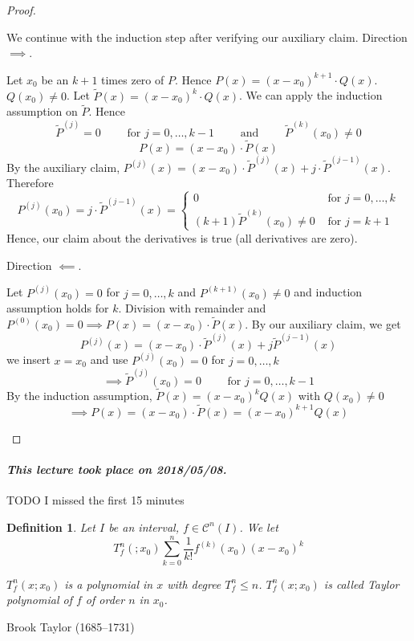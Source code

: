 \documentclass{article}
\newtheorem{definition}{Definition}  \numberwithin{definition}{section}
\newcommand{\dateref}[1]{\paragraph{\textit{This lecture took place on #1.}}}
\begin{document}
\begin{proof}
\begin{description}
      We continue with the induction step after verifying our auxiliary claim. Direction $\implies$.

      Let $x_0$ be an $k+1$ times zero of $P$. Hence $P(x) = (x - x_0)^{k+1} \cdot Q(x)$. $Q(x_0) \neq 0$.
      Let $\tilde P(x) = (x - x_0)^k \cdot Q(x)$. 
      We can apply the induction assumption on $\tilde P$. Hence
      \[ \tilde P^{(j)} = 0 \qquad \text{ for } j = 0, \ldots, k-1 \qquad \text{ and } \qquad \tilde P^{(k)}(x_0) \neq 0 \]
      \[ P(x) = (x - x_0) \cdot \tilde P(x) \]
      By the auxiliary claim, $P^{(j)}(x) = (x - x_0) \cdot \tilde P^{(j)}(x) + j \cdot \tilde P^{(j-1)}(x)$.
      Therefore
      \[
        P^{(j)}(x_0) = j \cdot \tilde P^{(j-1)}(x) = \begin{cases}
          0 & \text{ for } j = 0, \dots, k \\
          (k+1)\tilde P^{(k)}(x_0) \neq 0 & \text{ for } j = k+1
        \end{cases}
      \]
      Hence, our claim about the derivatives is true (all derivatives are zero).

      Direction $\impliedby$.

      Let $P^{(j)}(x_0) = 0$ for $j = 0, \dots, k$ and $P^{(k+1)}(x_0) \neq 0$ and induction assumption holds for $k$.
      Division with remainder and $P^{(0)}(x_0) = 0 \implies P(x) = (x - x_0) \cdot \tilde P(x)$.
      By our auxiliary claim, we get
      \[ P^{(j)}(x) = (x - x_0) \cdot \tilde P^{(j)}(x) + j \tilde P^{(j-1)}(x) \]
      we insert $x = x_0$ and use $P^{(j)}(x_0) = 0$ for $j = 0, \dots, k$
      \[ \implies \tilde P^{(j)}(x_0) = 0 \qquad \text{ for } j = 0, \dots, k-1 \]
      By the induction assumption, $\tilde P(x) = (x - x_0)^k Q(x)$ with $Q(x_0) \neq 0$
      \[ \implies P(x) = (x - x_0) \cdot \tilde P(x) = (x - x_0)^{k+1} Q(x) \]

  \end{description}
\end{proof}

\dateref{2018/05/08}

TODO I missed the first 15 minutes


\begin{definition} %
  \label{def3}
  Let $I$ be an interval, $f \in \mathcal C^n(I)$.
  We let
  \[ T_f^n(; x_0)  \sum_{k=0}^n \frac{1}{k!} f^{(k)}(x_0) (x - x_0)^k \]

  $T_f^n(x; x_0)$ is a polynomial in $x$ with degree $T_f^n \leq n$.
  $T_f^n(x; x_0)$ is called \emph{Taylor polynomial of $f$ of order $n$ in $x_0$}.
\end{definition}
Brook Taylor (1685--1731)
\end{document}

